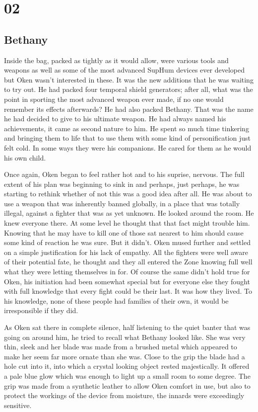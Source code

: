 \chapter{02}
\section{Bethany}


Inside the bag, packed as tightly as it would allow, were various tools and weapons as well as some of the most advanced SupHum devices ever developed but Oken wasn't interested in these. It was the new additions that he was waiting to try out. He had packed four temporal shield generators; after all, what was the point in sporting the most advanced weapon ever made, if no one would remember its effects afterwards? He had also packed Bethany. That was the name he had decided to give to his ultimate weapon. He had always named his achievements, it came as second nature to him. He spent so much time tinkering and bringing them to life that to use them with some kind of personification just felt cold. In some ways they were his companions. He cared for them as he would his own child.

Once again, Oken began to feel rather hot and to his suprise, nervous. The full extent of his plan was beginning to sink in and perhaps, just perhaps, he was starting to rethink whether of not this was a good idea after all. He was about to use a weapon that was inherently banned globally, in a place that was totally illegal, against a fighter that was as yet unknown. He looked around the room. He knew everyone there. At some level he thought that that fact might trouble him. Knowing that he may have to kill one of those sat nearest to him should cause some kind of reaction he was sure. But it didn't. Oken mused further and settled on a simple justification for his lack of empathy. All the fighters were well aware of their potential fate, he thought and they all entered the Zone knowing full well what they were letting themselves in for. Of course the same didn't hold true for Oken, his initiation had been somewhat special but for everyone else they fought with full knowledge that every fight could be their last. It was how they lived. To his knowledge, none of these people had families of their own, it would be irresponsible if they did.

As Oken sat there in complete silence, half listening to the quiet banter that was going on around him, he tried to recall what Bethany looked like. She was very thin, sleek and her blade was made from a brushed metal which appeared to make her seem far more ornate than she was. Close to the grip the blade had a hole cut into it, into which a crystal looking object rested majestically. It offered a pale blue glow which was enough to light up a small room to some degree. The grip was made from a synthetic leather to allow Oken comfort in use, but also to protect the workings of the device from moisture, the innards were exceedingly sensitive.

